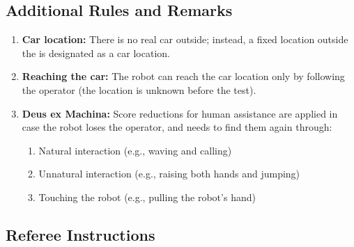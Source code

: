 \subsection*{Additional Rules and Remarks}
\begin{enumerate}[nosep]

	\item \textbf{Car location:} There is no real car outside; instead, a fixed location outside the \Arena{} is designated as a car location.

	\item \textbf{Reaching the car:} The robot can reach the car location only by following the operator (the location is unknown before the test).

	\item \textbf{Deus ex Machina:} Score reductions for human assistance are applied in case the robot loses the operator, and needs to find them again through:
    \begin{enumerate}
     \item Natural interaction (e.g., waving and calling)
     \item Unnatural interaction (e.g., raising both hands and jumping)
     \item Touching the robot (e.g., pulling the robot's hand)
    \end{enumerate}
\end{enumerate}


\subsection*{Referee Instructions}

